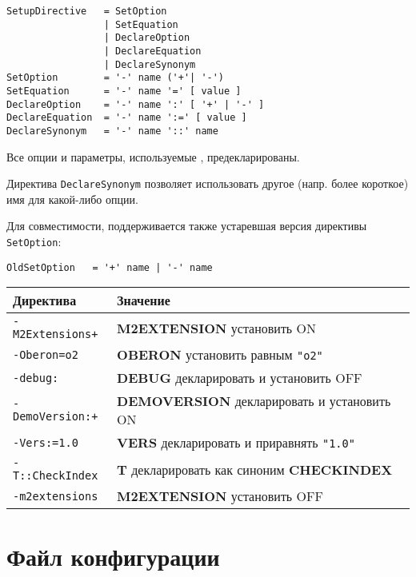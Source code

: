 \begin{verbatim}
SetupDirective   = SetOption
                 | SetEquation
                 | DeclareOption
                 | DeclareEquation
                 | DeclareSynonym
SetOption        = '-' name ('+'| '-')
SetEquation      = '-' name '=' [ value ]
DeclareOption    = '-' name ':' [ '+' | '-' ]
DeclareEquation  = '-' name ':=' [ value ]
DeclareSynonym   = '-' name '::' name
\end{verbatim}

Все опции и параметры, используемые \xds{}, предекларированы.

Директива \verb|DeclareSynonym| позволяет использовать другое
(напр. более короткое) имя для какой-либо опции.

Для совместимости, поддерживается также 
устаревшая версия директивы {\tt SetOption}:

\verb"OldSetOption   = '+' name | '-' name"

\Examples
\begin{flushleft}
\begin{tabular}{l|p{8.0cm}}
\bf Директива & \bf Значение \\ \hline
\verb|-M2Extensions+| & {\bf M2EXTENSION} установить ON \\
\verb|-Oberon=o2|     & {\bf OBERON} установить равным \verb|"o2"| \\
\verb|-debug:|        & {\bf DEBUG} декларировать и установить OFF \\
\verb|-DemoVersion:+| & {\bf DEMOVERSION} декларировать и установить ON \\
\verb|-Vers:=1.0|     & {\bf VERS} декларировать и приравнять \verb|"1.0"| \\
\verb|-T::CheckIndex| & {\bf T} декларировать как синоним {\bf CHECKINDEX} \\
\verb|-m2extensions|  & {\bf M2EXTENSION} установить OFF 
\end{tabular}
\end{flushleft}

\section{Файл конфигурации}\label{xc:cfg}

